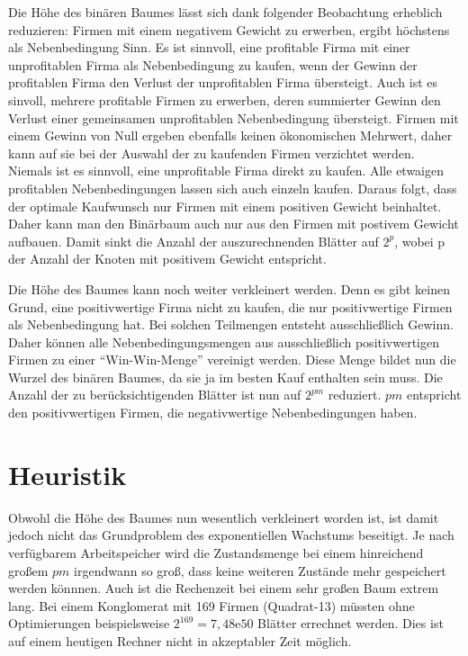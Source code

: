 Die Höhe des binären Baumes lässt sich dank folgender Beobachtung erheblich reduzieren:
Firmen mit einem negativem Gewicht zu erwerben, ergibt höchstens als Nebenbedingung Sinn. Es ist sinnvoll, eine profitable Firma mit einer unprofitablen Firma als Nebenbedingung zu kaufen, wenn der Gewinn der profitablen Firma den Verlust der unprofitablen Firma übersteigt. Auch ist es sinvoll, mehrere profitable Firmen zu erwerben, deren summierter Gewinn den Verlust einer gemeinsamen unprofitablen Nebenbedingung übersteigt. Firmen mit einem Gewinn von Null ergeben ebenfalls keinen ökonomischen Mehrwert, daher kann auf sie bei der Auswahl der zu kaufenden Firmen verzichtet werden.
Niemals ist es sinnvoll, eine unprofitable Firma direkt zu kaufen. Alle etwaigen profitablen Nebenbedingungen lassen sich auch einzeln kaufen. Daraus folgt, dass der optimale Kaufwunsch nur Firmen mit einem positiven Gewicht beinhaltet. Daher kann man den Binärbaum auch nur aus den Firmen mit postivem Gewicht aufbauen. Damit sinkt die Anzahl der auszurechnenden Blätter auf \(2^p\), wobei p der Anzahl der Knoten mit positivem Gewicht entspricht.

Die Höhe des Baumes kann noch weiter verkleinert werden. Denn es gibt keinen Grund, eine positivwertige Firma nicht zu kaufen, die nur positivwertige Firmen als Nebenbedingung hat. Bei solchen Teilmengen entsteht ausschließlich Gewinn. Daher können alle Nebenbedingungsmengen aus ausschließlich positivwertigen Firmen zu einer "`Win-Win-Menge"' vereinigt werden. Diese Menge bildet nun die Wurzel des binären Baumes, da sie ja im besten Kauf enthalten sein muss. Die Anzahl der zu berücksichtigenden Blätter ist nun auf \(2^{pm}\) reduziert. \(pm\) entspricht den positivwertigen Firmen, die negativwertige Nebenbedingungen haben.

\section{Heuristik}
Obwohl die Höhe des Baumes nun wesentlich verkleinert worden ist, ist damit jedoch nicht das Grundproblem des exponentiellen Wachstums beseitigt. Je nach verfügbarem Arbeitspeicher wird die Zustandsmenge bei einem hinreichend großem \(pm\) irgendwann so groß, dass keine weiteren Zustände mehr gespeichert werden könnnen. Auch ist die Rechenzeit bei einem sehr großen Baum extrem lang. Bei einem Konglomerat mit 169 Firmen (Quadrat-13) müssten ohne Optimierungen beispielsweise \(2^{169}=7,48\mathrm{e}{50}\) Blätter errechnet werden. Dies ist auf einem heutigen Rechner nicht in akzeptabler Zeit möglich.

